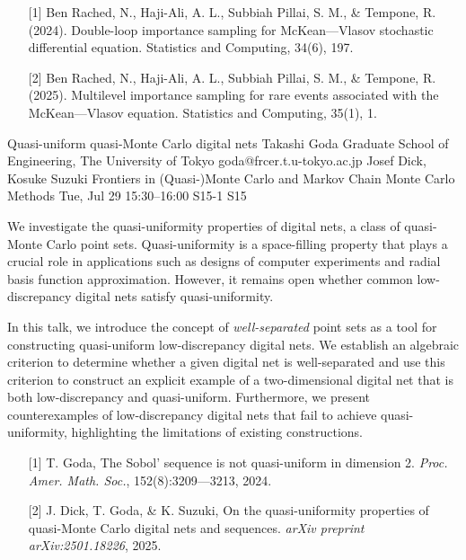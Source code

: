 \begin{talk}
\begin{enumerate}
	\item[{[1]}] Ben Rached, N., Haji-Ali, A. L., Subbiah Pillai, S. M., \& Tempone, R. (2024). Double-loop importance sampling for McKean---Vlasov stochastic differential equation. Statistics and Computing, 34(6), 197.
	\item[{[2]}] Ben Rached, N., Haji-Ali, A. L., Subbiah Pillai, S. M., \& Tempone, R. (2025). Multilevel importance sampling for rare events associated with the McKean---Vlasov equation. Statistics and Computing, 35(1), 1.
\end{enumerate}

\end{talk}

\begin{talk}
  {Quasi-uniform quasi-Monte Carlo digital nets}%
  {Takashi Goda}%
  {Graduate School of Engineering, The University of Tokyo}%
  {goda@frcer.t.u-tokyo.ac.jp}%
  {Josef Dick, Kosuke Suzuki}%
  {Frontiers in (Quasi-)Monte Carlo and Markov Chain Monte Carlo Methods}%
  {Tue, Jul 29 15:30–16:00}%
  {S15-1}%
  {S15}%
				
			
We investigate the quasi-uniformity properties of digital nets, a class of quasi-Monte Carlo point sets. Quasi-uniformity is a space-filling property that plays a crucial role in applications such as designs of computer experiments and radial basis function approximation. However, it remains open whether common low-discrepancy digital nets satisfy quasi-uniformity.

In this talk, we introduce the concept of \emph{well-separated} point sets as a tool for constructing quasi-uniform low-discrepancy digital nets. We establish an algebraic criterion to determine whether a given digital net is well-separated and use this criterion to construct an explicit example of a two-dimensional digital net that is both low-discrepancy and quasi-uniform. Furthermore, we present counterexamples of low-discrepancy digital nets that fail to achieve quasi-uniformity, highlighting the limitations of existing constructions.

\begin{enumerate}
	\item[{[1]}] T. Goda, The Sobol’ sequence is not quasi-uniform in dimension 2. \emph{Proc. Amer. Math. Soc.}, 152(8):3209---3213, 2024.
	\item[{[2]}] J. Dick, T. Goda, \& K. Suzuki, On the quasi-uniformity properties of quasi-Monte Carlo digital nets and sequences. \emph{arXiv preprint arXiv:2501.18226}, 2025.
\end{enumerate}
\end{talk}

